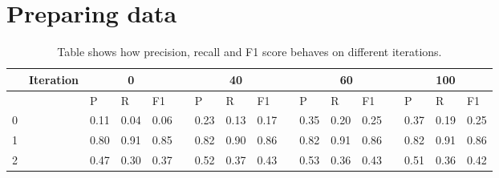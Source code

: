 \documentclass[10pt, a4paper]{article}
\begin{document}
\section{Preparing data}
\begin{table}[t!]
	\centering
	\caption{Table shows how precision, recall and F1 score behaves on different iterations.}
	\label{tbl:Scores}
	\begin{tabular}{lllllllllllllllll}
		\hline
		& Iteration             & \multicolumn{3}{c}{0}                                                             &                       & \multicolumn{3}{c}{40}                                                            &                       & \multicolumn{4}{c}{60}                                                                                    & \multicolumn{3}{c}{100} \\ \hline
		\multicolumn{1}{l}{}  & \multicolumn{1}{l}{} & \multicolumn{1}{l}{P}    & \multicolumn{1}{l}{R}    & \multicolumn{1}{l}{F1}   & \multicolumn{1}{l}{} & \multicolumn{1}{l}{P}    & \multicolumn{1}{l}{R}    & \multicolumn{1}{l}{F1}   & \multicolumn{1}{l}{} & \multicolumn{1}{l}{P}    & \multicolumn{1}{l}{R}    & \multicolumn{1}{l}{F1}   & \multicolumn{1}{l}{} & P      & R      & F1     \\ \hline
		\multicolumn{1}{l}{0} & \multicolumn{1}{l}{} & \multicolumn{1}{l}{0.11} & \multicolumn{1}{l}{0.04} & \multicolumn{1}{l}{0.06} & \multicolumn{1}{l}{} & \multicolumn{1}{l}{0.23} & \multicolumn{1}{l}{0.13} & \multicolumn{1}{l}{0.17} & \multicolumn{1}{l}{} & \multicolumn{1}{l}{0.35} & \multicolumn{1}{l}{0.20} & \multicolumn{1}{l}{0.25} & \multicolumn{1}{l}{} & 0.37   & 0.19   & 0.25   \\ \hline
		\multicolumn{1}{l}{1} & \multicolumn{1}{l}{} & \multicolumn{1}{l}{0.80} & \multicolumn{1}{l}{0.91} & \multicolumn{1}{l}{0.85} & \multicolumn{1}{l}{} & \multicolumn{1}{l}{0.82} & \multicolumn{1}{l}{0.90} & \multicolumn{1}{l}{0.86} & \multicolumn{1}{l}{} & \multicolumn{1}{l}{0.82} & \multicolumn{1}{l}{0.91} & \multicolumn{1}{l}{0.86} & \multicolumn{1}{l}{} & 0.82   & 0.91   & 0.86   \\ \hline
		\multicolumn{1}{l}{2} & \multicolumn{1}{l}{} & \multicolumn{1}{l}{0.47} & \multicolumn{1}{l}{0.30} & \multicolumn{1}{l}{0.37} & \multicolumn{1}{l}{} & \multicolumn{1}{l}{0.52} & \multicolumn{1}{l}{0.37} & \multicolumn{1}{l}{0.43} & \multicolumn{1}{l}{} & \multicolumn{1}{l}{0.53} & \multicolumn{1}{l}{0.36} & \multicolumn{1}{l}{0.43} & \multicolumn{1}{l}{} & 0.51   & 0.36   & 0.42   \\ \hline
	\end{tabular}
\end{table}
\end{document}
